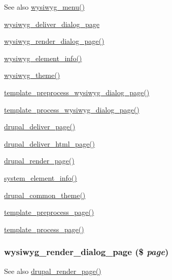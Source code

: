 \begin{DoxySeeAlso}{See also}
\hyperlink{wysiwyg_8module_a7bbcb615ff86965ede6de1ebdaf1f360}{wysiwyg\_\-menu()} 

\hyperlink{wysiwyg_8dialog_8inc_a11742186be99db206b09a5682afa2130}{wysiwyg\_\-deliver\_\-dialog\_\-page} 

\hyperlink{wysiwyg_8dialog_8inc_a7c9acb68c62f91fa07a346e18d70407f}{wysiwyg\_\-render\_\-dialog\_\-page()} 

\hyperlink{wysiwyg_8module_a558b7da961229a8d501fa8581d802093}{wysiwyg\_\-element\_\-info()} 

\hyperlink{wysiwyg_8module_a03b61c521946527bba7ecee753da3256}{wysiwyg\_\-theme()} 

\hyperlink{wysiwyg_8dialog_8inc_a01e89cc085ea9214d877749b55f50639}{template\_\-preprocess\_\-wysiwyg\_\-dialog\_\-page()} 

\hyperlink{wysiwyg_8dialog_8inc_ac59a9d7f504a104da018256132f53b60}{template\_\-process\_\-wysiwyg\_\-dialog\_\-page()}

\hyperlink{common_8inc_a1537b4ccc064fb7d8106effcac8caac3}{drupal\_\-deliver\_\-page()} 

\hyperlink{common_8inc_a05ab0d6e81d6cbe2a6b9f645b9e710ec}{drupal\_\-deliver\_\-html\_\-page()} 

\hyperlink{common_8inc_ad85d021b660f070849ed7c215d9758fe}{drupal\_\-render\_\-page()} 

\hyperlink{system_8module_a39faa9a5430a70bb37a3c8af72460a14}{system\_\-element\_\-info()} 

\hyperlink{common_8inc_a1263ef82e0da5b85f8203783ed164872}{drupal\_\-common\_\-theme()} 

\hyperlink{includes_2theme_8inc_a128dae24f990d8ba4710ac78b0584c11}{template\_\-preprocess\_\-page()} 

\hyperlink{includes_2theme_8inc_aa9c8d115ebdc2baeae402b3d7e6b392b}{template\_\-process\_\-page()} 
\end{DoxySeeAlso}
\hypertarget{wysiwyg_8dialog_8inc_a7c9acb68c62f91fa07a346e18d70407f}{
\subsubsection[{wysiwyg\_\-render\_\-dialog\_\-page}]{\setlength{\rightskip}{0pt plus 5cm}wysiwyg\_\-render\_\-dialog\_\-page (\$ {\em page})}}
\label{wysiwyg_8dialog_8inc_a7c9acb68c62f91fa07a346e18d70407f}
\begin{DoxySeeAlso}{See also}
\hyperlink{common_8inc_ad85d021b660f070849ed7c215d9758fe}{drupal\_\-render\_\-page()} 
\end{DoxySeeAlso}

